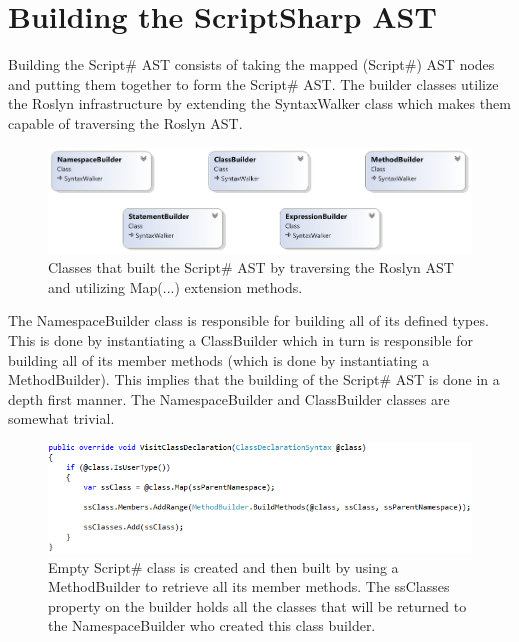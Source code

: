 \section{Building the ScriptSharp AST} %
\label{sec:building_the_scriptsharp_ast}
	Building the Script\# AST consists of taking the mapped (Script\#) AST nodes and putting them together to form the Script\# AST. The builder classes utilize the Roslyn infrastructure by extending the SyntaxWalker class which makes them capable of traversing the Roslyn AST.
	\begin{figure}[H]
		\begin{center}
			\centerline{\includegraphics[width=16cm]{resources/images/BuilderClasses.png}}
		\end{center}
		\caption{Classes that built the Script\# AST by traversing the Roslyn AST and utilizing Map(...) extension methods.}
		\label{builderClasses}
	\end{figure}

	The NamespaceBuilder class is responsible for building all of its defined types. This is done by instantiating a ClassBuilder which in turn is responsible for building all of its member methods (which is done by instantiating a MethodBuilder). This implies that the building of the Script\# AST is done in a depth first manner. The NamespaceBuilder and ClassBuilder classes are somewhat trivial. 

	\begin{figure}[H]
		\begin{center}
			\centerline{\includegraphics[width=16cm]{resources/images/VisitClassDeclaration.png}}
		\end{center}
		\caption{Empty Script\# class is created and then built by using a MethodBuilder to retrieve all its member methods. The ssClasses property on the builder holds all the classes that will be returned to the NamespaceBuilder who created this class builder.}
		\label{visitClassDeclaration}
	\end{figure}

